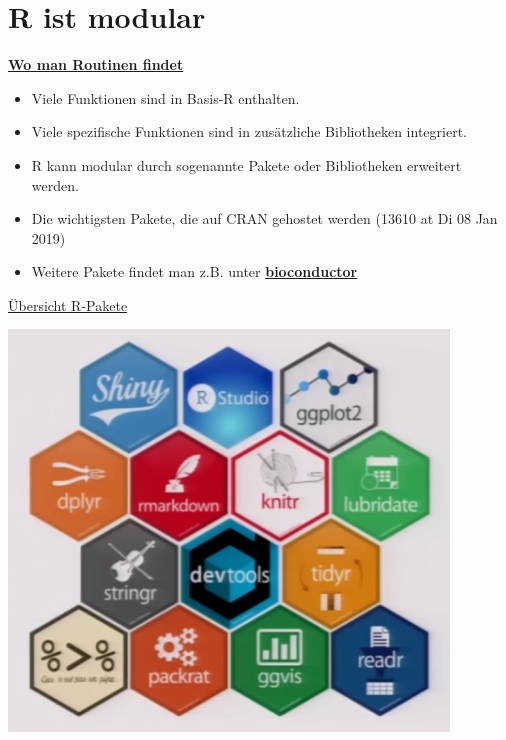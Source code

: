 \documentclass[ignorenonframetext,]{beamer}
\providecommand{\tightlist}{%
  \setlength{\itemsep}{0pt}\setlength{\parskip}{0pt}}
\begin{document}
\section{R ist modular}\label{r-ist-modular}

\begin{frame}{\href{https://stats.idre.ucla.edu/r/seminars/intro/}{\textbf{Wo
man Routinen findet}}}

\begin{itemize}
\tightlist
\item
  Viele Funktionen sind in Basis-R enthalten.
\item
  Viele spezifische Funktionen sind in zusätzliche Bibliotheken
  integriert.
\item
  R kann modular durch sogenannte Pakete oder Bibliotheken erweitert
  werden.
\item
  Die wichtigsten Pakete, die auf CRAN gehostet werden (13610 at Di 08
  Jan 2019)
\item
  Weitere Pakete findet man z.B. unter
  \href{www.bioconductor.org}{\textbf{bioconductor}}
\end{itemize}

\end{frame}

\begin{frame}{\href{https://www.youtube.com/watch?v=kKI9--Opmso}{Übersicht
R-Pakete}}

\includegraphics{figure/packages_overview.PNG}

\end{frame}
\end{document}
